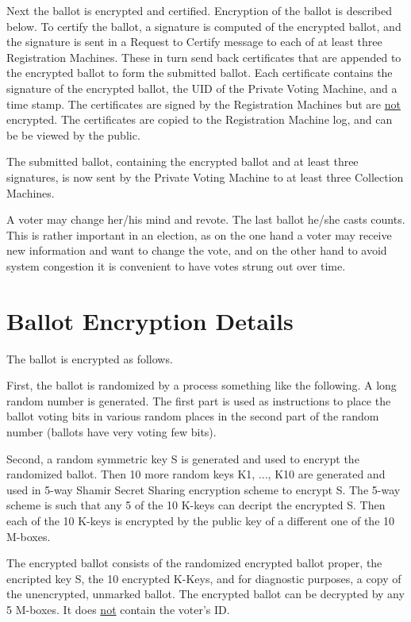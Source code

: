 \documentclass[12pt]{article}
\begin{document}
Next the ballot is encrypted and certified.  Encryption of the
ballot is described below.  To certify the ballot, a signature
is computed of the encrypted ballot, and the signature is sent
in a Request to Certify message to each of at least three Registration
Machines.  These in turn send back certificates that are appended
to the encrypted ballot to form the submitted ballot.  Each
certificate contains the signature of the encrypted ballot, the
UID of the Private Voting Machine, and a time stamp.  The certificates
are signed by the Registration Machines but are \underline{not} encrypted.
The certificates are copied to the Registration Machine log, and can be
be viewed by the public.

The submitted ballot, containing the encrypted ballot and
at least three signatures, is now sent by the Private Voting
Machine to at least three Collection Machines.

A voter may change her/his mind and revote.  The last ballot
he/she casts counts.  This is rather important in an election,
as on the one hand a voter may receive new information and
want to change the vote, and on the other hand to avoid system
congestion it is convenient to have votes strung out over time.

\section{Ballot Encryption Details}

The ballot is encrypted as follows.

First, the ballot is randomized by a process something like
the following.  A long random number is generated.  The first
part is used as instructions to place the ballot voting bits in
various random places in the second part of the random number
(ballots have very voting few bits).

Second, a random symmetric key S is generated and used to encrypt
the randomized ballot.  Then 10 more random keys K1, ..., K10 are generated
and used in 5-way Shamir Secret Sharing encryption
scheme to encrypt S.  The 5-way
scheme is such that any 5 of the 10 K-keys can decript the encrypted S.
Then each of the 10 K-keys is encrypted by the public key
of a different one of the 10 M-boxes.

The encrypted ballot consists of the randomized encrypted ballot proper,
the encripted key S, the 10 encrypted K-Keys, and for
diagnostic purposes, a copy of the unencrypted, unmarked ballot.  The
encrypted ballot can be decrypted
by any 5 M-boxes.  It does \underline{not} contain the voter's ID.
\end{document}
